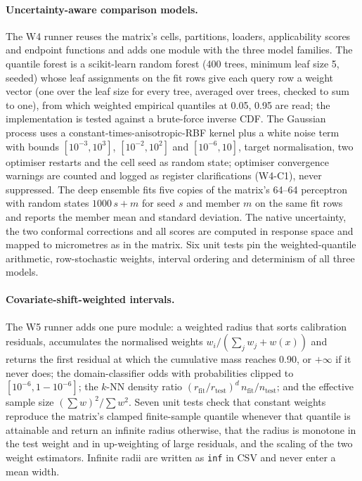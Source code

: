 \documentclass[11pt,a4paper]{article}
\begin{document}
\paragraph{Uncertainty-aware comparison models.} The W4 runner reuses the
matrix's cells, partitions, loaders, applicability scores and endpoint
functions and adds one module with the three model families. The quantile
forest is a scikit-learn random forest (400 trees, minimum leaf size 5,
seeded) whose leaf assignments on the fit rows give each query row a weight
vector (one over the leaf size for every tree, averaged over trees, checked
to sum to one), from which weighted empirical quantiles at 0.05, 0.95 are
read; the implementation is tested against a brute-force inverse CDF. The
Gaussian process uses a constant-times-anisotropic-RBF kernel plus a white
noise term with bounds $[10^{-3},10^{3}]$, $[10^{-2},10^{2}]$ and
$[10^{-6},10]$, target normalisation, two optimiser restarts and the cell seed
as random state; optimiser convergence warnings are counted and logged as register clarifications (W4-C1), never suppressed. The deep ensemble fits five copies of the
matrix's 64--64 perceptron with random states $1000\,s+m$ for seed $s$ and
member $m$ on the same fit rows and reports the member mean and standard
deviation. The native uncertainty, the two conformal corrections and all
scores are computed in response space and mapped to micrometres as in the
matrix. Six unit tests pin the weighted-quantile arithmetic, row-stochastic
weights, interval ordering and determinism of all three models.

\paragraph{Covariate-shift-weighted intervals.} The W5 runner adds one pure
module: a weighted radius that sorts calibration residuals, accumulates the
normalised weights $w_i/(\sum_j w_j + w(x))$ and returns the first residual at
which the cumulative mass reaches 0.90, or $+\infty$ if it never does; the
domain-classifier odds with probabilities clipped to
$[10^{-6},1-10^{-6}]$; the $k$-NN density ratio
$(r_{\mathrm{fit}}/r_{\mathrm{test}})^{d}\,n_{\mathrm{fit}}/n_{\mathrm{test}}$;
and the effective sample size $(\sum w)^2/\sum w^2$. Seven unit tests check
that constant weights reproduce the matrix's clamped finite-sample quantile
whenever that quantile is attainable and return an infinite radius otherwise,
that the radius is monotone in the test weight and in up-weighting of large
residuals, and the scaling of the two weight estimators. Infinite radii are
written as \texttt{inf} in CSV and never enter a mean width.
\end{document}
